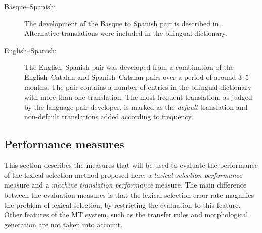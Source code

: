 \documentclass[11pt]{article}
\newcommand{\comment}[1]{\todo{#1}}
\begin{document}
\begin{description}
\item[Basque--Spanish:] The development of the Basque to Spanish pair
  is described in \cite{ginesti09}. 
  Alternative translations were included in the bilingual
  dictionary.%

\item[English--Spanish:] The English--Spanish pair was developed from
  a combination of the English--Catalan and Spanish--Catalan pairs
  over a period of around 3--5 months. The pair 
  contains a number of entries in the bilingual dictionary with
  more than one translation. The most-frequent translation, as judged
  by the language pair developer, is marked as the \emph{default}
  translation and non-default translations added according to
  frequency. 
\end{description}


\subsection{Performance measures}
\label{ss:measures}

This section describes the measures that will be used to evaluate the
performance of the lexical selection method proposed here: a
\emph{lexical selection performance} measure and a \emph{machine
  translation performance} measure. The main difference between the
evaluation measures is that the lexical selection error rate magnifies
the problem of lexical selection, by restricting the evaluation to
this feature. Other features of the MT system, such as the transfer rules
and morphological generation are not taken into account.
\end{document}
